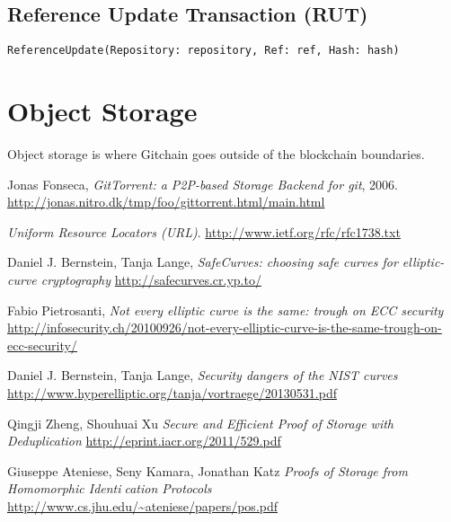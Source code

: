 \documentclass[a4paper]{article}
\begin{document}
\subsection{Reference Update Transaction (RUT)}

\begin{verbatim}
ReferenceUpdate(Repository: repository, Ref: ref, Hash: hash)
\end{verbatim}

\section{Object Storage}

Object storage is where Gitchain goes outside of the blockchain boundaries.

\begin{thebibliography}{9}

  Jonas Fonseca,
  \emph{GitTorrent: a P2P-based Storage Backend for git}, 2006.
  \url{http://jonas.nitro.dk/tmp/foo/gittorrent.html/main.html}

  \emph{Uniform Resource Locators (URL)}.
  \url{http://www.ietf.org/rfc/rfc1738.txt}

  Daniel J. Bernstein, Tanja Lange,
  \emph{SafeCurves: choosing safe curves for elliptic-curve cryptography}
  \url{http://safecurves.cr.yp.to/}

  Fabio Pietrosanti,
  \emph{Not every elliptic curve is the same: trough on ECC security}
  \url{http://infosecurity.ch/20100926/not-every-elliptic-curve-is-the-same-trough-on-ecc-security/}

  Daniel J. Bernstein, Tanja Lange,
  \emph{Security dangers of the NIST curves}
  \url{http://www.hyperelliptic.org/tanja/vortraege/20130531.pdf}

  Qingji Zheng, Shouhuai Xu
  \emph{Secure and Efficient Proof of Storage with Deduplication}
  \url{http://eprint.iacr.org/2011/529.pdf}

  Giuseppe Ateniese, Seny Kamara, Jonathan Katz
  \emph{Proofs of Storage from Homomorphic Identication Protocols}
  \url{http://www.cs.jhu.edu/~ateniese/papers/pos.pdf}

\end{thebibliography}
\end{document}
